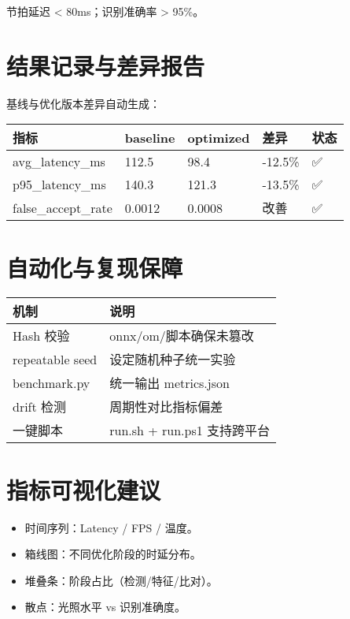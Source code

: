 节拍延迟 \textless{} 80ms；识别准确率 \textgreater{} 95\%。

\section{结果记录与差异报告}\label{ux7ed3ux679cux8bb0ux5f55ux4e0eux5deeux5f02ux62a5ux544a}

基线与优化版本差异自动生成：

\begin{longtable}[]{@{}lllll@{}}
\toprule\noalign{}
指标 & baseline & optimized & 差异 & 状态 \\
\midrule\noalign{}
\endhead
\bottomrule\noalign{}
\endlastfoot
avg\_latency\_ms & 112.5 & 98.4 & -12.5\% & ✅ \\
p95\_latency\_ms & 140.3 & 121.3 & -13.5\% & ✅ \\
false\_accept\_rate & 0.0012 & 0.0008 & 改善 & ✅ \\
\end{longtable}

\section{自动化与复现保障}\label{ux81eaux52a8ux5316ux4e0eux590dux73b0ux4fddux969c}

\begin{longtable}[]{@{}ll@{}}
\toprule\noalign{}
机制 & 说明 \\
\midrule\noalign{}
\endhead
\bottomrule\noalign{}
\endlastfoot
Hash 校验 & onnx/om/脚本确保未篡改 \\
repeatable seed & 设定随机种子统一实验 \\
benchmark.py & 统一输出 metrics.json \\
drift 检测 & 周期性对比指标偏差 \\
一键脚本 & run.sh + run.ps1 支持跨平台 \\
\end{longtable}

\section{指标可视化建议}\label{ux6307ux6807ux53efux89c6ux5316ux5efaux8bae}

\begin{itemize}
\tightlist
\item
  时间序列：Latency / FPS / 温度。
\item
  箱线图：不同优化阶段的时延分布。
\item
  堆叠条：阶段占比（检测/特征/比对）。
\item
  散点：光照水平 vs 识别准确度。
\end{itemize}

